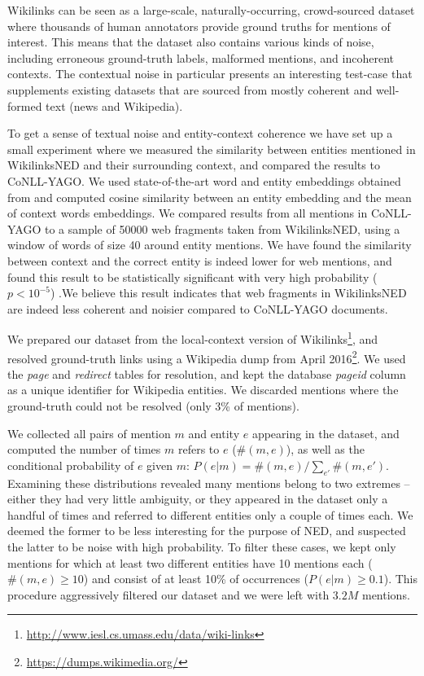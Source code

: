 \documentclass[11pt]{article}
\begin{document}
	Wikilinks can be seen as a large-scale, naturally-occurring, crowd-sourced dataset where thousands of human annotators provide ground truths for mentions of interest. This means that the dataset also contains various kinds of noise, including erroneous ground-truth labels, malformed mentions, and incoherent contexts. The contextual noise in particular presents an interesting test-case that supplements existing datasets that are sourced from mostly coherent and well-formed text (news and Wikipedia). 
	
	To get a sense of textual noise and entity-context coherence we have set up a small experiment where we measured the similarity between entities mentioned in WikilinksNED and their surrounding context, and compared the results to CoNLL-YAGO. We used state-of-the-art word and entity embeddings obtained from  and computed cosine similarity between an entity embedding and the mean of context words embeddings. We compared results from all mentions in CoNLL-YAGO to a sample of 50000 web fragments taken from WikilinksNED, using a window of words of size 40 around entity mentions. We have found the similarity between context and the correct entity is indeed lower for web mentions, and found this result to be statistically significant with very high probability ($p<10^{-5}$) .We believe this result indicates that web fragments in WikilinksNED are indeed less coherent and noisier compared to CoNLL-YAGO documents.
	
	We prepared our dataset from the local-context version of Wikilinks\footnote{\url{http://www.iesl.cs.umass.edu/data/wiki-links}}, and resolved ground-truth links using a Wikipedia dump from April 2016\footnote{\url{https://dumps.wikimedia.org/}}. We used the \emph{page} and \emph{redirect} tables for resolution, and kept the database \emph{pageid} column as a unique identifier for Wikipedia entities. We discarded mentions where the ground-truth could not be resolved (only 3\% of mentions).
	
	We collected all pairs of mention $m$ and entity $e$ appearing in the dataset, and computed the number of times $m$ refers to $e$ ($\#(m,e)$), as well as the conditional probability of $e$ given $m$: $P(e|m)=\#(m,e)/\sum_{e'}\#(m,e')$. Examining these distributions revealed many mentions belong to two extremes -- either they had very little ambiguity, or they appeared in the dataset only a handful of times and referred to different entities only a couple of times each. We deemed the former to be less interesting for the purpose of NED, and suspected the latter to be noise with high probability. To filter these cases, we kept only mentions for which at least two different entities have 10 mentions each ($\#(m,e) \ge 10$) and consist of at least 10\% of occurrences ($P(e|m) \ge 0.1$). This procedure aggressively filtered our dataset and we were left with $3.2M$ mentions.
	
\end{document}

